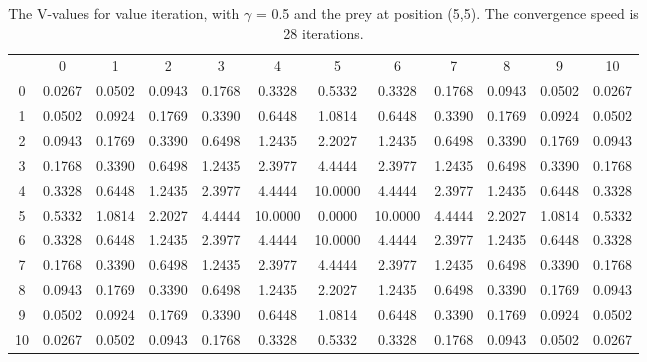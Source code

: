\documentclass{article}
\begin{document}
\begin{landscape}
\begin{table}[tbp]
\centering
\begin{tabular} {c c c c c c c c c c c c}
 & 0 & 1 & 2 & 3 & 4 & 5 & 6 & 7 & 8 & 9 & 10 \\
 0 & 0.0267 &  0.0502 &  0.0943 &  0.1768 &  0.3328 &  0.5332 &  0.3328 &  0.1768 &  0.0943 &  0.0502 &  0.0267\\
1 & 0.0502 &  0.0924 &  0.1769 &  0.3390 &  0.6448 &  1.0814 &  0.6448 &  0.3390 &  0.1769 &  0.0924 &  0.0502\\
2 & 0.0943 &  0.1769 &  0.3390 &  0.6498 &  1.2435 &  2.2027 &  1.2435 &  0.6498 &  0.3390 &  0.1769 &  0.0943\\
3 & 0.1768 &  0.3390 &  0.6498 &  1.2435 &  2.3977 &  4.4444 &  2.3977 &  1.2435 &  0.6498 &  0.3390 &  0.1768\\
4 & 0.3328 &  0.6448 &  1.2435 &  2.3977 &  4.4444 & 10.0000 &  4.4444 &  2.3977 &  1.2435 &  0.6448 &  0.3328\\
5 & 0.5332 &  1.0814 &  2.2027 &  4.4444 & 10.0000 &  0.0000 & 10.0000 &  4.4444 &  2.2027 &  1.0814 &  0.5332\\
6 & 0.3328 &  0.6448 &  1.2435 &  2.3977 &  4.4444 & 10.0000 &  4.4444 &  2.3977 &  1.2435 &  0.6448 &  0.3328\\
7 & 0.1768 &  0.3390 &  0.6498 &  1.2435 &  2.3977 &  4.4444 &  2.3977 &  1.2435 &  0.6498 &  0.3390 &  0.1768\\
8 & 0.0943 &  0.1769 &  0.3390 &  0.6498 &  1.2435 &  2.2027 &  1.2435 &  0.6498 &  0.3390 &  0.1769 &  0.0943\\
9 & 0.0502 &  0.0924 &  0.1769 &  0.3390 &  0.6448 &  1.0814 &  0.6448 &  0.3390 &  0.1769 &  0.0924 &  0.0502\\
10 & 0.0267 &  0.0502 &  0.0943 &  0.1768 &  0.3328 &  0.5332 &  0.3328 &  0.1768 &  0.0943 &  0.0502 &  0.0267\\
\end{tabular}\\
\caption{The V-values for value iteration, with $\gamma$ = 0.5 and the prey at position (5,5). The convergence speed is 28 iterations.}
\label{valueiteration2}
\end{table}


\end{landscape}
\end{document}
